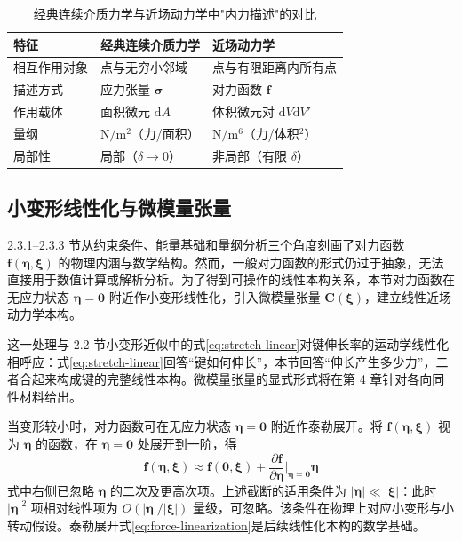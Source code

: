 \begin{table}[htbp]
  \centering
  \small
  \caption{经典连续介质力学与近场动力学中"内力描述"的对比}
  \label{tab:stress-vs-pairwise-force}
  \begin{tabular}{>{\raggedright\arraybackslash}p{}>{\raggedright\arraybackslash}p{}>{\raggedright\arraybackslash}p{}}
    \toprule
    特征 & 经典连续介质力学 & 近场动力学 \\
    \midrule
    相互作用对象 & 点与无穷小邻域 & 点与有限距离内所有点 \\
    描述方式 & 应力张量 $\boldsymbol{\sigma}$ & 对力函数 $\mathbf{f}$ \\
    作用载体 & 面积微元 $\mathrm{d}A$ & 体积微元对 $\mathrm{d}V\mathrm{d}V'$ \\
    量纲 & $\mathrm{N}/\mathrm{m}^{2}$（力/面积） & $\mathrm{N}/\mathrm{m}^{6}$（力/体积$^2$）\\
    局部性 & 局部（$\delta\to 0$） & 非局部（有限 $\delta$）\\
    \bottomrule
  \end{tabular}
\end{table}



\subsection{小变形线性化与微模量张量}

2.3.1--2.3.3 节从约束条件、能量基础和量纲分析三个角度刻画了对力函数 $\mathbf{f}(\boldsymbol{\eta},\boldsymbol{\xi})$ 的物理内涵与数学结构。然而，一般对力函数的形式仍过于抽象，无法直接用于数值计算或解析分析。为了得到可操作的线性本构关系，本节对力函数在无应力状态 $\boldsymbol{\eta}=\mathbf{0}$ 附近作小变形线性化，引入微模量张量 $\mathbf{C}(\boldsymbol{\xi})$，建立线性近场动力学本构。

这一处理与 2.2 节小变形近似中的式\eqref{eq:stretch-linear}对键伸长率的运动学线性化相呼应：式\eqref{eq:stretch-linear}回答``键如何伸长''，本节回答``伸长产生多少力''，二者合起来构成键的完整线性本构。微模量张量的显式形式将在第 4 章针对各向同性材料给出。

当变形较小时，对力函数可在无应力状态 $\boldsymbol{\eta}=\mathbf{0}$ 附近作泰勒展开。将 $\mathbf{f}(\boldsymbol{\eta},\boldsymbol{\xi})$ 视为 $\boldsymbol{\eta}$ 的函数，在 $\boldsymbol{\eta}=\mathbf{0}$ 处展开到一阶，得
\begin{equation}
  \mathbf{f}(\boldsymbol{\eta},\boldsymbol{\xi})\approx\mathbf{f}(\mathbf{0},\boldsymbol{\xi})+\frac{\partial\mathbf{f}}{\partial\boldsymbol{\eta}}\bigg|_{\boldsymbol{\eta}=\mathbf{0}}\boldsymbol{\eta}
  \label{eq:force-linearization}
\end{equation}
式中右侧已忽略 $\boldsymbol{\eta}$ 的二次及更高次项。上述截断的适用条件为 $|\boldsymbol{\eta}|\ll|\boldsymbol{\xi}|$：此时 $|\boldsymbol{\eta}|^{2}$ 项相对线性项为 $O(|\boldsymbol{\eta}|/|\boldsymbol{\xi}|)$ 量级，可忽略。该条件在物理上对应小变形与小转动假设。泰勒展开式\eqref{eq:force-linearization}是后续线性化本构的数学基础。

